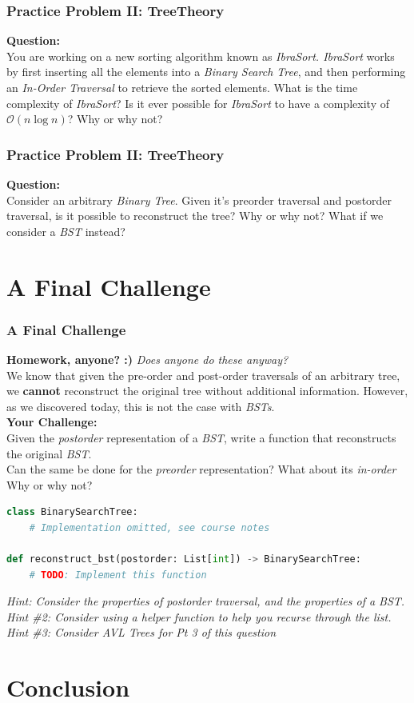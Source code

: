 \documentclass[hyperref={colorlinks,citecolor=blue,linkcolor=blue,urlcolor=blue}, aspectratio=1610]{beamer}
\begin{document}
\begin{frame}
  \frametitle{Practice Problem II: TreeTheory}
  \textbf{Question:} \\
  You are working on a new sorting algorithm known as \textit{IbraSort. IbraSort} works by first inserting all the elements into a \textit{Binary Search Tree}, and then performing an \textit{In-Order Traversal} to retrieve the sorted elements. What is the time complexity of \textit{IbraSort}? Is it ever possible for \textit{IbraSort} to have a complexity of $\mathcal{O}(n \log n)$? Why or why not?
\end{frame}

\begin{frame}
  \frametitle{Practice Problem II: TreeTheory}
  \textbf{Question:} \\
  Consider an arbitrary \textit{Binary Tree}. Given it's preorder traversal and postorder traversal, is it possible to reconstruct the tree? Why or why not? What if we consider a \textit{BST} instead? \\
\end{frame}

\section{A Final Challenge}
\begin{frame}[fragile]
  \frametitle{A Final Challenge}
  \textbf{Homework, anyone? :)} \textit{Does anyone do these anyway?} \\
  We know that given the pre-order and post-order traversals of an arbitrary tree, we \textbf{cannot} reconstruct the original tree without additional information. However, as we discovered today, this is not the case with \textit{BSTs}. \\
  \textbf{Your Challenge:} \\
  Given the \textit{postorder} representation of a \textit{BST}, write a function that reconstructs the original \textit{BST}. \\
  Can the same be done for the \textit{preorder} representation? What about its \textit{in-order} Why or why not? \\
  \begin{lstlisting}[language=Python, style=mystyle]
class BinarySearchTree:
    # Implementation omitted, see course notes
  
def reconstruct_bst(postorder: List[int]) -> BinarySearchTree:
    # TODO: Implement this function
  \end{lstlisting}
  \textit{Hint: Consider the properties of postorder traversal, and the properties of a BST.} \\ \textit{Hint \#2: Consider using a helper function to help you recurse through the list.} \\ \textit{Hint \#3: Consider AVL Trees for Pt 3 of this question}

\section{Conclusion}
\end{frame}
\end{document}
